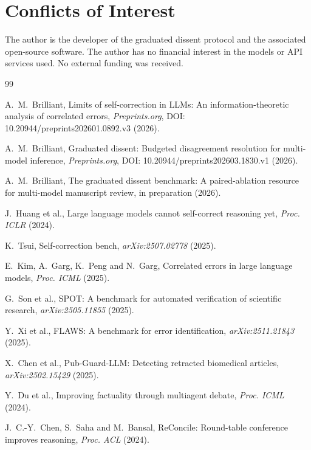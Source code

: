 \documentclass{ws-ijprai}
\begin{document}
\section*{Conflicts of Interest}
The author is the developer of the graduated dissent protocol and the
associated open-source software. The author has no financial interest in the
models or API services used. No external funding was received.



\begin{thebibliography}{99}

A.~M.~Brilliant, Limits of self-correction in LLMs: An information-theoretic
analysis of correlated errors, \textit{Preprints.org}, DOI:
10.20944/preprints202601.0892.v3 (2026).

A.~M.~Brilliant, Graduated dissent: Budgeted disagreement resolution for
multi-model inference, \textit{Preprints.org}, DOI:
10.20944/preprints202603.1830.v1 (2026).

A.~M.~Brilliant, The graduated dissent benchmark: A paired-ablation resource
for multi-model manuscript review, in preparation (2026).

J.~Huang et al., Large language models cannot self-correct reasoning yet,
\textit{Proc. ICLR} (2024).

K.~Tsui, Self-correction bench, \textit{arXiv:2507.02778} (2025).

E.~Kim, A.~Garg, K.~Peng and N.~Garg, Correlated errors in large language
models, \textit{Proc. ICML} (2025).

G.~Son et al., SPOT: A benchmark for automated verification of scientific
research, \textit{arXiv:2505.11855} (2025).

Y.~Xi et al., FLAWS: A benchmark for error identification,
\textit{arXiv:2511.21843} (2025).

X.~Chen et al., Pub-Guard-LLM: Detecting retracted biomedical articles,
\textit{arXiv:2502.15429} (2025).

Y.~Du et al., Improving factuality through multiagent debate,
\textit{Proc. ICML} (2024).

J.~C.-Y.~Chen, S.~Saha and M.~Bansal, ReConcile: Round-table conference
improves reasoning, \textit{Proc. ACL} (2024).


\end{thebibliography}
\end{document}
